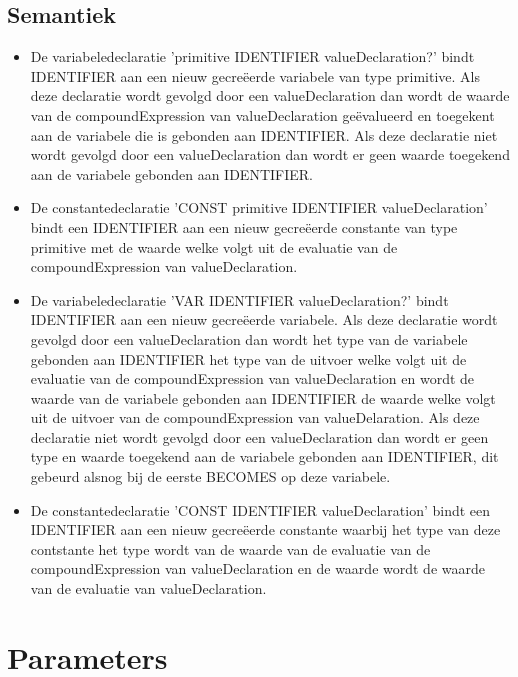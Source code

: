     \subsection{Semantiek}
        \begin{itemize}
        \item De variabeledeclaratie 'primitive IDENTIFIER valueDeclaration?' bindt IDENTIFIER aan een nieuw gecre\"{e}erde variabele van type primitive. Als deze declaratie wordt gevolgd door een valueDeclaration dan wordt de waarde van de compoundExpression van valueDeclaration ge\"{e}valueerd en toegekent aan de variabele die is gebonden aan IDENTIFIER. Als deze declaratie niet wordt gevolgd door een valueDeclaration dan wordt er geen waarde toegekend aan de variabele gebonden aan IDENTIFIER.
        \item De constantedeclaratie 'CONST primitive IDENTIFIER valueDeclaration' bindt een IDENTIFIER aan een nieuw gecre\"{e}erde constante van type primitive met de waarde welke volgt uit de evaluatie van de compoundExpression van valueDeclaration.
        \item De variabeledeclaratie 'VAR IDENTIFIER valueDeclaration?' bindt IDENTIFIER aan een nieuw gecre\"{e}erde variabele. Als deze declaratie wordt gevolgd door een valueDeclaration dan wordt het type van de variabele gebonden aan IDENTIFIER het type van de uitvoer welke volgt uit de evaluatie van de compoundExpression van valueDeclaration en wordt de waarde van de variabele gebonden aan IDENTIFIER de waarde welke volgt uit de uitvoer van de compoundExpression van valueDelaration. Als deze declaratie niet wordt gevolgd door een valueDeclaration dan wordt er geen type en waarde toegekend aan de variabele gebonden aan IDENTIFIER, dit gebeurd alsnog bij de eerste BECOMES op deze variabele.
        \item De constantedeclaratie 'CONST IDENTIFIER valueDeclaration' bindt een IDENTIFIER aan een nieuw gecre\"{e}erde constante waarbij het type van deze contstante het type wordt van de waarde van de evaluatie van de compoundExpression van valueDeclaration en de waarde wordt de waarde van de evaluatie van valueDeclaration. 
        \end{itemize}
\section{Parameters}

